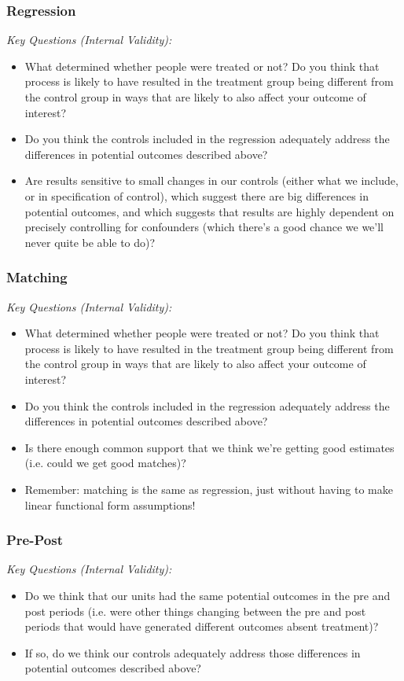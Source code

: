 \documentclass[12pt]{article}
\begin{document}
\subsubsection*{Regression}
\emph{Key Questions (Internal Validity):}
\begin{itemize}
    \item What determined whether people were treated or not? Do you think that process is likely to have resulted in the treatment group being different from the control group in ways that are likely to also affect your outcome of interest?
    \item Do you think the controls included in the regression adequately address the differences in potential outcomes described above?
    \item Are results sensitive to small changes in our controls (either what we include, or in specification of control), which suggest there are big differences in potential outcomes, and which suggests that results are highly dependent on precisely controlling for confounders (which there's a good chance we we'll never quite be able to do)?
\end{itemize}

\subsubsection*{Matching}
\emph{Key Questions (Internal Validity):}
\begin{itemize}
    \item What determined whether people were treated or not? Do you think that process is likely to have resulted in the treatment group being different from the control group in ways that are likely to also affect your outcome of interest?
    \item Do you think the controls included in the regression adequately address the differences in potential outcomes described above?
    \item Is there enough common support that we think we're getting good estimates (i.e. could we get good matches)?
    \item Remember: matching is the same as regression, just without having to make linear functional form assumptions!
\end{itemize}

\subsubsection*{Pre-Post}
\emph{Key Questions (Internal Validity):}
\begin{itemize}
    \item Do we think that our units had the same potential outcomes in the pre and post periods (i.e. were other things changing between the pre and post periods that would have generated different outcomes absent treatment)?
    \item If so, do we think our controls adequately address those differences in potential outcomes described above?
\end{itemize}
\end{document}
